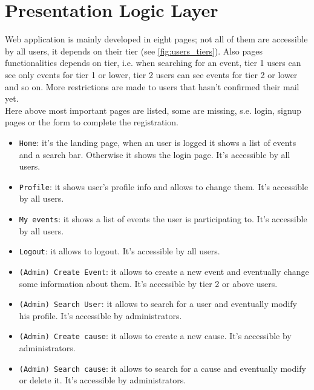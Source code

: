 \section{Presentation Logic Layer}

Web application is mainly developed in eight pages; not all of them are accessible by all users, it depends on their tier (see \ref{fig:users_tiers}). Also pages functionalities depends on tier, i.e. when searching for an event, tier 1 users can see only events for tier 1 or lower, tier 2 users can see events for tier 2 or lower and so on. More restrictions are made to users that hasn't confirmed their mail yet.\\
Here above most important pages are listed, some are missing, s.e. login, signup pages or the form to complete the registration.

\begin{itemize}
    \item \texttt{Home}: it's the landing page, when an user is logged it shows a list of events and a search bar. Otherwise it shows the login page. It's accessible by all users.
    \item \texttt{Profile}: it shows user's profile info and allows to change them. It's accessible by all users.
    \item \texttt{My events}: it shows a list of events the user is participating to. It's accessible by all users.
    \item \texttt{Logout}: it allows to logout. It's accessible by all users.
    \item \texttt{(Admin) Create Event}: it allows to create a new event and eventually change some information about them. It's accessible by tier 2 or above users.
    \item \texttt{(Admin) Search User}: it allows to search for a user and eventually modify his profile. It's accessible by administrators.
    \item \texttt{(Admin) Create cause}: it allows to create a new cause. It's accessible by administrators.
    \item \texttt{(Admin) Search cause}: it allows to search for a cause and eventually modify or delete it. It's accessible by administrators.
\end{itemize}

